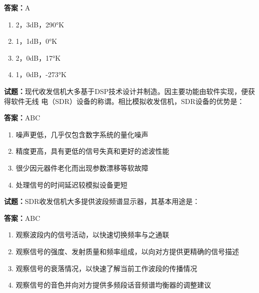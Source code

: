 \documentclass{ctexbook}
\begin{document}
\textbf{答案：}A 

\begin{enumerate}[leftmargin=3em]
  \item 2，3dB，290°K 

  \item 1，1dB，0°K 

  \item 2，0dB，17°K 

  \item 1，0dB，-273°K 

\end{enumerate}





\vspace{1em}

\textbf{试题：}现代收发信机大多基于DSP技术设计并制造。因主要功能由软件实现，便获得软件无线
电（SDR）设备的称谓。相比模拟收发信机，SDR设备的优势是： 

\textbf{答案：}ABC 

\begin{enumerate}[leftmargin=3em]
  \item 噪声更低，几乎仅包含数字系统的量化噪声 

  \item 精度更高，具有更低的信号失真和更好的滤波性能 

  \item 很少因元器件老化而出现参数漂移等软故障 

  \item 处理信号的时间延迟较模拟设备更短 

\end{enumerate}





\vspace{1em}

\textbf{试题：}SDR收发信机大多提供波段频谱显示器，其基本用途是： 

\textbf{答案：}ABC 

\begin{enumerate}[leftmargin=3em]
  \item 观察波段内的信号活动，以快速切换频率与之通联 

  \item 观察信号的强度、发射质量和频率组成，以向对方提供更精确的信号描述 

  \item 观察信号的衰落情况，以快速了解当前工作波段的传播情况 

  \item 观察信号的音色并向对方提供多频段话音频谱均衡器的调整建议 

\end{enumerate}
\end{document}
